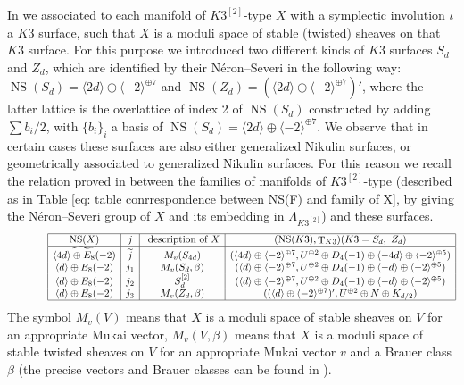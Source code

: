 \documentclass{amsart}
\theoremstyle{definition}
\numberwithin{equation}{section}
\numberwithin{equation}{section} \theoremstyle{definition}
\DeclareMathOperator{\NS}{NS}
\DeclareMathOperator{\T}{T}
\begin{document}
In \cite{CGKK} we associated to each manifold of $K3^{[2]}$-type $X$ with a symplectic involution $\iota$ a $K3$ surface, such that $X$ is a moduli space of stable (twisted) sheaves on that $K3$ surface. For this purpose we introduced two different kinds of $K3$ surfaces $S_d$ and $Z_d$, which are identified by their N\'eron--Severi in the following way: $\NS(S_d)= \langle 2d\rangle\oplus \langle -2\rangle^{\oplus 7}$ and $\NS(Z_d)=(\langle 2d\rangle\oplus \langle -2\rangle^{\oplus 7})'$, where the latter lattice is the overlattice of index 2 of $\NS(S_d)$ constructed by adding $\sum b_i/2$, with $\{b_i\}_i$ a basis of $\NS(S_d)=\langle 2d\rangle\oplus \langle -2\rangle^{\oplus 7}$. We observe that in certain cases these surfaces are also either generalized Nikulin surfaces, or geometrically associated to generalized Nikulin surfaces. For this reason we recall the relation proved in \cite{CGKK} between the families of  manifolds of $K3^{[2]}$-type (described as in Table \ref{eq: table conrrespondence between NS(F) and family of X}, by giving the N\'eron--Severi group of $X$ and its embedding in $\Lambda_{K3^{[2]}}$)
and these surfaces. 
\begin{align}\label{eq: X as twisted moduli space of sheaf}\ \ \ \ \ \ \ \ \ \ \ \ \begin{array}{|c|c|c|c|c|c|}
\hline
\NS(X)&j&\mbox{ description of }X&(\NS(K3),\T_{K3}) (K3=S_d,\ Z_d)\\
\hline  
\widetilde{\langle 4d\rangle\oplus E_8(-2)}&\widetilde{j}&M_v(S_{4d})&(\langle 4d\rangle\oplus \langle -2\rangle^{\oplus 7}, U^{\oplus 2}\oplus D_4(-1)\oplus \langle -4d\rangle\oplus \langle -2\rangle^{\oplus 5})\\
\langle d\rangle\oplus E_8(-2)&j_1&M_v(S_{d},\beta)&(\langle d\rangle\oplus \langle -2\rangle^{\oplus 7}, U^{\oplus 2}\oplus D_4(-1)\oplus \langle -d\rangle\oplus \langle -2\rangle^{\oplus 5})\\
\langle d  \rangle\oplus E_8(-2)&j_2&S_{d}^{[2]}&(\langle d\rangle\oplus \langle -2\rangle^{\oplus 7}, U^{\oplus 2}\oplus D_4(-1)\oplus \langle - d\rangle\oplus \langle -2\rangle^{\oplus 5})\\
\langle d\rangle\oplus E_8(-2)&j_3&M_v(Z_{d},\beta)&((\langle d\rangle\oplus \langle -2\rangle^{\oplus 7})', U^{\oplus 2}\oplus N\oplus K_{d/2})\\
\hline
\end{array}\end{align}
The symbol $M_v(V)$ means that $X$ is a moduli space of stable sheaves on $V$ for an appropriate Mukai vector, $M_v(V,\beta)$ means that $X$ is a moduli space of stable twisted sheaves on $V$ for an appropriate Mukai vector $v$ and a Brauer class $\beta$ (the precise vectors and Brauer classes can be found in \cite{CGKK}). 
\end{document}
